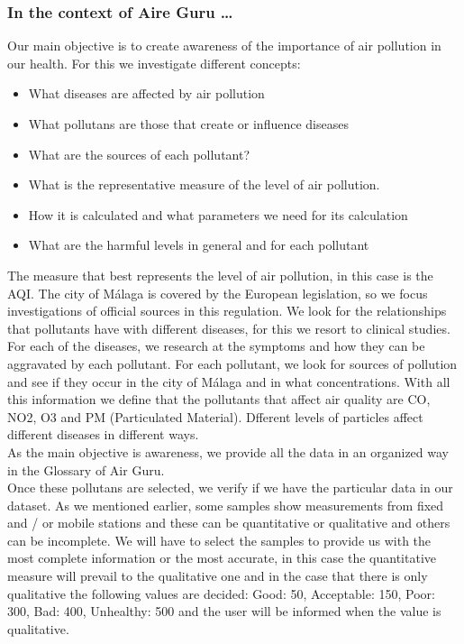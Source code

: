 \subsubsection*{In the context of Aire Guru \ldots} 
Our main objective is to create awareness of the importance of air pollution in our health. For this we investigate different concepts:
\begin{itemize}
    \item What diseases are affected by air pollution
    \item What pollutans are those that create or influence diseases
    \item What are the sources of each pollutant?
    \item What is the representative measure of the level of air pollution.
    \item How it is calculated and what parameters we need for its calculation
    \item What are the harmful levels in general and for each pollutant
\end{itemize}
The measure that best represents the level of air pollution, in this case is the AQI. The city of Málaga is covered by the European legislation, 
so we focus investigations of official sources in this regulation.
We look for the relationships that pollutants have with different diseases, for this we resort to clinical studies. For each of the diseases, we 
research at the symptoms and how they can be aggravated by each pollutant.
For each pollutant, we look for sources of pollution and see if they occur in the city of Málaga and in what concentrations.
With all this information we define that the pollutants that affect air quality are CO, NO2, O3 and PM (Particulated Material). Dfferent levels of particles
affect different diseases in different ways. \\

As the main objective is awareness, we provide all the data in an organized way in the Glossary of Air Guru. \\

Once these pollutans are selected, we verify if we have the particular data in our dataset. As we mentioned earlier, some samples show measurements 
from fixed and / or mobile stations and these can be quantitative or qualitative and others can be incomplete. We will have to select the
samples to provide us with the most complete information or the most accurate, in this case the quantitative measure will prevail to the qualitative 
one and in the case that there is only qualitative
the following values are decided: Good: 50, Acceptable: 150, Poor: 300, Bad: 400, Unhealthy: 500 and the user will be informed when the value is qualitative. \\


